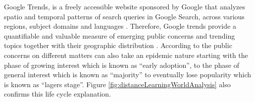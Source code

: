 \documentclass[11pt,a4paper,]{article}
\begin{document}
Google Trends, is a freely accessible website sponsored by Google that analyzes spatio and temporal patterns of search queries in Google Search, across various regions, subject domains and languages \autocite{carneiro2009google}. Therefore, Google trends provide a quantifiable and valuable measure of emerging public concerns and trending topics together with their geographic distribution \autocite{alicino2015assessing,cook2011assessing}. According to \textcite{jarynowski2020perception} the public concerns on different matters can also take an epidemic nature starting with the phase of growing interest which is known as ``early adoption'', to the phase of general interest which is known as ``majority'' to eventually lose popularity which is known as ``lagers stage''. Figure \ref{fig:distanceLearningWorldAnalysis} also confirms this life cycle explanation.
\end{document}
